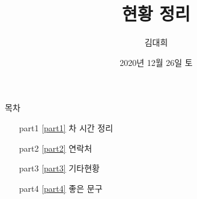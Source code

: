 \documentclass[aspectratio=1610,20pt,xcolor=pdftex,dvipsnames,table,handout]{beamer}
\begin{document}
	

			\title{ 현황 정리 }
			\author{ 김대희 }
			\date{ 
					2020년 
					12월 
					26일
					토  
					} 


%
%
%
%
%



		\begin{frame}[plain]
		\titlepage
		\end{frame}


		\begin{frame} [plain]{목차}
		\tableofcontents%

			\setlength{\leftmargini}{ 2em}			
			\begin{itemize}

				\item [part1] \ref{part1}	차 시간 정리
				\item [part2] \ref{part2}	연락처
				\item [part3] \ref{part3}	기타현황
				\item [part4] \ref{part4}	좋은 문구

			\end{itemize}



		\end{frame}

		\begin{frame} [t,plain]
		\end{frame}						
		\begin{frame} [t,plain]
		\end{frame}						
\end{document}
